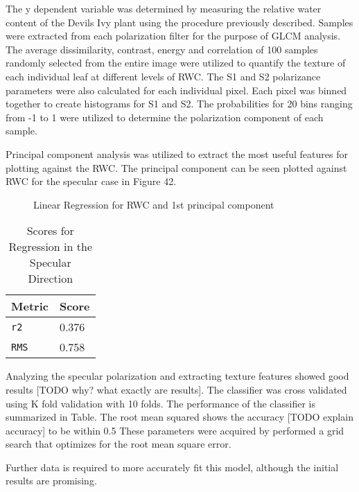 The y dependent variable was determined by measuring the relative water content of the Devils Ivy plant using the procedure previously described.  Samples were extracted from each polarization filter for the purpose of GLCM analysis.  The average dissimilarity, contrast, energy and correlation of 100 samples randomly selected from the entire image were utilized to quantify the texture of each individual leaf at different levels of RWC.  The S1 and S2 polarizance parameters were also calculated for each individual pixel. Each pixel was binned together to create histograms for S1 and S2.  The probabilities for 20 bins ranging from -1 to 1 were utilized to determine the polarization component of each sample.

Principal component analysis was utilized to extract the most useful features for plotting against the RWC.  The principal component can be seen plotted against RWC for the specular case in Figure 42.
%
\begin{figure}[!htb]
    \begin{center}
    \end{center}
    \caption{Linear Regression for RWC and 1st principal component}
    \label{fig:polarization}
\end{figure}
%
%
\begin{table}[htb]
  \centering
  \begin{tabular}{ll}
    \toprule
    \textbf{Metric} & \textbf{Score}\\
    \midrule
      \texttt{r2} & 0.376 \\
      \texttt{RMS} & 0.758 \\
    \bottomrule
  \end{tabular}
  \caption{%
    Scores for Regression in the Specular Direction
  }
  \label{tab:Packages}
\end{table}
%
Analyzing the specular polarization and extracting texture features showed good results [TODO why? what exactly are results].  The classifier was cross validated using K fold validation with 10 folds.  The performance of the classifier is summarized in Table.
The root mean squared shows the accuracy [TODO explain accuracy] to be within 0.5%
These parameters were acquired by performed a grid search that optimizes for the root mean square error.

Further data is required to more accurately fit this model, although the initial results are promising.
